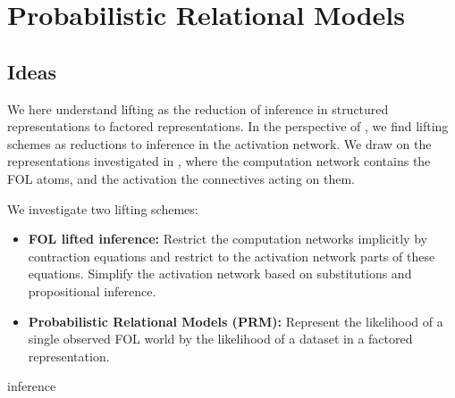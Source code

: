 \chapter{Probabilistic Relational Models}\label{cha:probabilisticRelationalModels}



\section{Ideas}

We here understand lifting as the reduction of inference in structured representations to factored representations.
In the perspective of \ComputationActivationNetworks{}, we find lifting schemes as reductions to inference in the activation network.
We draw on the representations investigated in , where the computation network contains the FOL atoms, and the activation the connectives acting on them.


We investigate two lifting schemes:
\begin{itemize}
    \item \textbf{FOL lifted inference:}
    Restrict the computation networks implicitly by contraction equations and restrict to the activation network parts of these equations.
    Simplify the activation network based on substitutions and propositional inference.
    \item \textbf{Probabilistic Relational Models (PRM):}
    Represent the likelihood of a single observed FOL world by the likelihood of a dataset in a factored representation.
\end{itemize}


{inference}


